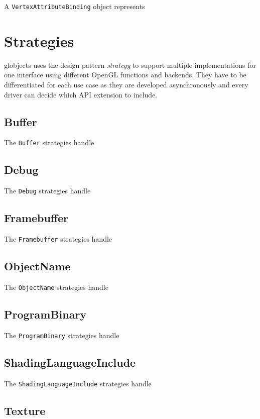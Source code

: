 \documentclass{article}
\begin{document}
A \verb|VertexAttributeBinding| object represents 

\section{Strategies}

globjects uses the design pattern \emph{strategy} to support multiple implementations for one interface using different OpenGL functions and backends. They have to be differentiated for each use case as they are developed asynchronously and every driver can decide which API extension to include.

\subsection{Buffer}

The \verb|Buffer| strategies handle

\subsection{Debug}

The \verb|Debug| strategies handle

\subsection{Framebuffer}

The \verb|Framebuffer| strategies handle

\subsection{ObjectName}

The \verb|ObjectName| strategies handle

\subsection{ProgramBinary}

The \verb|ProgramBinary| strategies handle

\subsection{ShadingLanguageInclude}

The \verb|ShadingLanguageInclude| strategies handle

\subsection{Texture}
\end{document}
